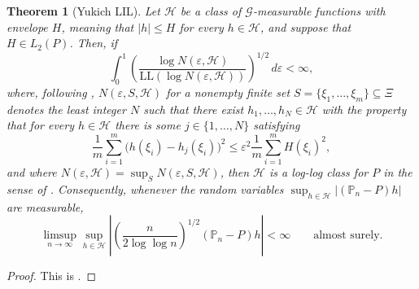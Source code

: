 \documentclass[11pt]{article}
\newtheorem{theorem}{Theorem}[section]
\begin{document}
\begin{theorem}[Yukich LIL]\label{thm:yukich} Let $\mathcal{H}$ be
a class of $\mathcal{G}$-measurable functions with envelope $H$, meaning that $\lvert h\rvert\le H$ for every $h\in\mathcal{H}$,
and suppose that $H\in L_{2}(P)$. Then, if 
\begin{equation}
\int_{0}^{1}\left(\frac{\log N(\varepsilon,\mathcal{H})}{\mathrm{LL}(\log N(\varepsilon,\mathcal{H}))}\right)^{1/2}\,d\varepsilon<\infty,\label{eq:yukich-integral}
\end{equation}
where, following \citet[Definition~1.2]{Yukich1990}, $N(\varepsilon,S,\mathcal{H})$
for a nonempty finite set $S=\{\xi_{1},\dots,\xi_{m}\}\subseteq\Xi$
denotes the least integer $N$ such that there exist $h_{1},\dots,h_{N}\in\mathcal{H}$
with the property that for every $h\in\mathcal{H}$ there is some
$j\in\{1,\dots,N\}$ satisfying 
\[
\frac{1}{m}\sum_{i=1}^{m}\bigl(h(\xi_{i})-h_{j}(\xi_{i})\bigr)^{2}\le\varepsilon^{2}\frac{1}{m}\sum_{i=1}^{m}H(\xi_{i})^{2},
\]
and where $N(\varepsilon,\mathcal{H})=\sup_{S}N(\varepsilon,S,\mathcal{H})$,
then $\mathcal{H}$ is a log-log class for $P$ in the sense of
\citet{Yukich1990}. Consequently, whenever the random variables
$\sup_{h\in\mathcal{H}}\lvert(\mathbb{P}_{n}-P)h\rvert$ are measurable,
\begin{equation}
\limsup_{n\to\infty}\sup_{h\in\mathcal{H}}\left|\left(\frac{n}{2\log\log n}\right)^{1/2}(\mathbb{P}_{n}-P)h\right|<\infty\qquad\text{almost surely.}\label{eq:yukich-blil}
\end{equation}
\end{theorem} 
\begin{proof}
This is \citet[Theorem~5]{Yukich1990}. 
\end{proof}
%
\end{document}
